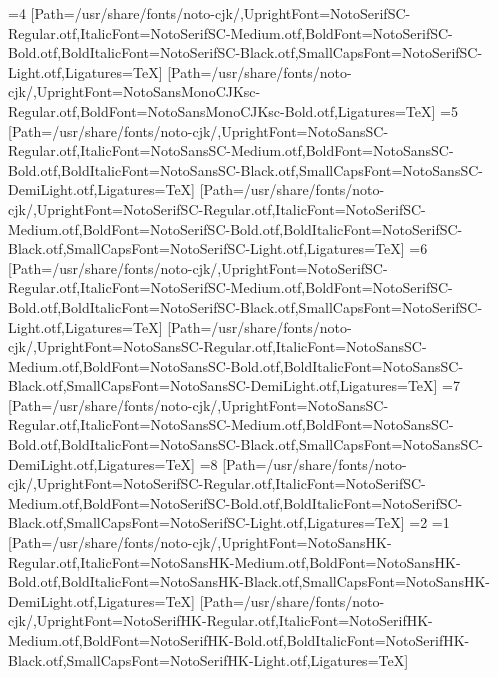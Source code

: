 \else\ifnum\value{CJKFonts}=4
[Path=/usr/share/fonts/noto-cjk/,UprightFont=NotoSerifSC-Regular.otf,ItalicFont=NotoSerifSC-Medium.otf,BoldFont=NotoSerifSC-Bold.otf,BoldItalicFont=NotoSerifSC-Black.otf,SmallCapsFont=NotoSerifSC-Light.otf,Ligatures=TeX]
[Path=/usr/share/fonts/noto-cjk/,UprightFont=NotoSansMonoCJKsc-Regular.otf,BoldFont=NotoSansMonoCJKsc-Bold.otf,Ligatures=TeX]
\else\ifnum\value{CJKFonts}=5
[Path=/usr/share/fonts/noto-cjk/,UprightFont=NotoSansSC-Regular.otf,ItalicFont=NotoSansSC-Medium.otf,BoldFont=NotoSansSC-Bold.otf,BoldItalicFont=NotoSansSC-Black.otf,SmallCapsFont=NotoSansSC-DemiLight.otf,Ligatures=TeX]
[Path=/usr/share/fonts/noto-cjk/,UprightFont=NotoSerifSC-Regular.otf,ItalicFont=NotoSerifSC-Medium.otf,BoldFont=NotoSerifSC-Bold.otf,BoldItalicFont=NotoSerifSC-Black.otf,SmallCapsFont=NotoSerifSC-Light.otf,Ligatures=TeX]
\else\ifnum\value{CJKFonts}=6
[Path=/usr/share/fonts/noto-cjk/,UprightFont=NotoSerifSC-Regular.otf,ItalicFont=NotoSerifSC-Medium.otf,BoldFont=NotoSerifSC-Bold.otf,BoldItalicFont=NotoSerifSC-Black.otf,SmallCapsFont=NotoSerifSC-Light.otf,Ligatures=TeX]
[Path=/usr/share/fonts/noto-cjk/,UprightFont=NotoSansSC-Regular.otf,ItalicFont=NotoSansSC-Medium.otf,BoldFont=NotoSansSC-Bold.otf,BoldItalicFont=NotoSansSC-Black.otf,SmallCapsFont=NotoSansSC-DemiLight.otf,Ligatures=TeX]
\else\ifnum\value{CJKFonts}=7
[Path=/usr/share/fonts/noto-cjk/,UprightFont=NotoSansSC-Regular.otf,ItalicFont=NotoSansSC-Medium.otf,BoldFont=NotoSansSC-Bold.otf,BoldItalicFont=NotoSansSC-Black.otf,SmallCapsFont=NotoSansSC-DemiLight.otf,Ligatures=TeX]
\else\ifnum\value{CJKFonts}=8
[Path=/usr/share/fonts/noto-cjk/,UprightFont=NotoSerifSC-Regular.otf,ItalicFont=NotoSerifSC-Medium.otf,BoldFont=NotoSerifSC-Bold.otf,BoldItalicFont=NotoSerifSC-Black.otf,SmallCapsFont=NotoSerifSC-Light.otf,Ligatures=TeX]
\fi\fi\fi\fi\fi\fi\fi\fi\else
\ifnum\value{CJKLanguage}=2
\ifnum\value{CJKFonts}=1
[Path=/usr/share/fonts/noto-cjk/,UprightFont=NotoSansHK-Regular.otf,ItalicFont=NotoSansHK-Medium.otf,BoldFont=NotoSansHK-Bold.otf,BoldItalicFont=NotoSansHK-Black.otf,SmallCapsFont=NotoSansHK-DemiLight.otf,Ligatures=TeX]
[Path=/usr/share/fonts/noto-cjk/,UprightFont=NotoSerifHK-Regular.otf,ItalicFont=NotoSerifHK-Medium.otf,BoldFont=NotoSerifHK-Bold.otf,BoldItalicFont=NotoSerifHK-Black.otf,SmallCapsFont=NotoSerifHK-Light.otf,Ligatures=TeX]
